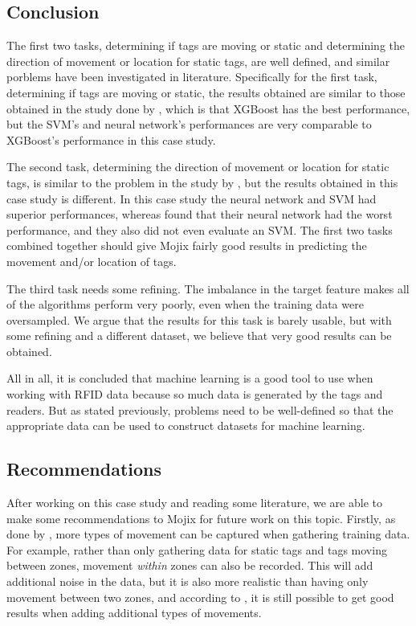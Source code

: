 \documentclass{article}
\begin{document}
\subsection{Conclusion}

The first two tasks, determining if tags are moving or static and determining the direction of movement or location for static tags, are well defined, and similar porblems have been investigated in literature.
Specifically for the first task, determining if tags are moving or static, the results obtained are similar to those obtained in the study done by \citet{ref:Alfian}, which is that XGBoost has the best performance, but the \ac{SVM}'s and neural network's performances are very comparable to XGBoost's performance in this case study.

The second task, determining the direction of movement or location for static tags, is similar to the problem in the study by \citet{ref:Alfian}, but the results obtained in this case study is different.
In this case study the neural network and \ac{SVM} had superior performances, whereas \citet{ref:Alfian} found that their neural network had the worst performance, and they also did not even evaluate an \ac{SVM}.
The first two tasks combined together should give Mojix fairly good results in predicting the movement and/or location of tags.

The third task needs some refining.
The imbalance in the target feature makes all of the algorithms perform very poorly, even when the training data were oversampled.
We argue that the results for this task is barely usable, but with some refining and a different dataset, we believe that very good results can be obtained.

All in all, it is concluded that machine learning is a good tool to use when working with \ac{RFID} data because so much data is generated by the tags and readers.
But as stated previously, problems need to be well-defined so that the appropriate data can be used to construct datasets for machine learning.

\subsection{Recommendations}

After working on this case study and reading some literature, we are able to make some recommendations to Mojix for future work on this topic.
Firstly, as done by \citet{ref:Alfian}, more types of movement can be captured when gathering training data.
For example, rather than only gathering data for static tags and tags moving between zones, movement \emph{within} zones can also be recorded.
This will add additional noise in the data, but it is also more realistic than having only movement between two zones, and according to \citet{ref:Alfian}, it is still possible to get good results when adding additional types of movements.
\end{document}

